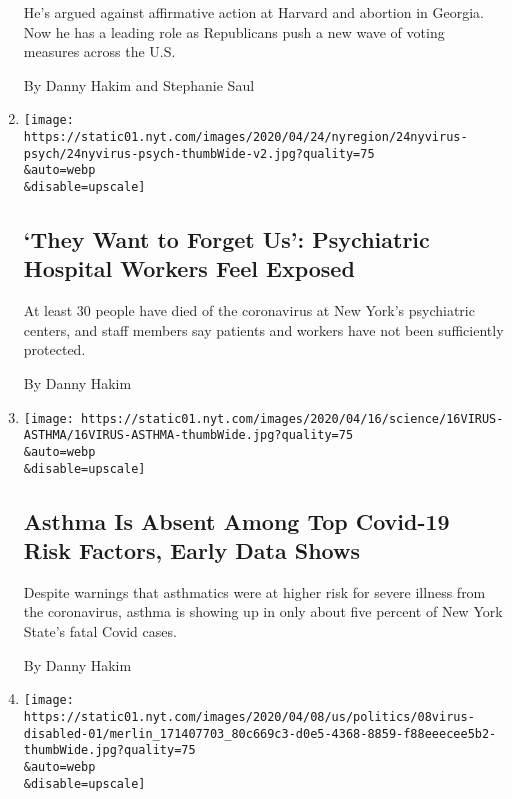 \begin{enumerate}
  He's argued against affirmative action at Harvard and abortion in
  Georgia. Now he has a leading role as Republicans push a new wave of
  voting measures across the U.S.

  By Danny Hakim and Stephanie Saul
\item
  \href{/2020/04/24/nyregion/coronavirus-new-york-psychiatric-hospitals.html}{}

  \texttt{[image: https://static01.nyt.com/images/2020/04/24/nyregion/24nyvirus-psych/24nyvirus-psych-thumbWide-v2.jpg?quality=75\\\&auto=webp\\\&disable=upscale]}

  \hypertarget{they-want-to-forget-us-psychiatric-hospital-workers-feel-exposed}{%
  \subsection{`They Want to Forget Us': Psychiatric Hospital Workers
  Feel
  Exposed}\label{they-want-to-forget-us-psychiatric-hospital-workers-feel-exposed}}

  At least 30 people have died of the coronavirus at New York's
  psychiatric centers, and staff members say patients and workers have
  not been sufficiently protected.

  By Danny Hakim
\item
  \href{/2020/04/16/health/coronavirus-asthma-risk.html}{}

  \texttt{[image: https://static01.nyt.com/images/2020/04/16/science/16VIRUS-ASTHMA/16VIRUS-ASTHMA-thumbWide.jpg?quality=75\\\&auto=webp\\\&disable=upscale]}

  \hypertarget{asthma-is-absent-among-top-covid-19-risk-factors-early-data-shows}{%
  \subsection{Asthma Is Absent Among Top Covid-19 Risk Factors, Early
  Data
  Shows}\label{asthma-is-absent-among-top-covid-19-risk-factors-early-data-shows}}

  Despite warnings that asthmatics were at higher risk for severe
  illness from the coronavirus, asthma is showing up in only about five
  percent of New York State's fatal Covid cases.

  By Danny Hakim
\item
  \href{/2020/04/08/nyregion/coronavirus-disabilities-group-homes.html}{}

  \texttt{[image: https://static01.nyt.com/images/2020/04/08/us/politics/08virus-disabled-01/merlin\_171407703\_80c669c3-d0e5-4368-8859-f88eeecee5b2-thumbWide.jpg?quality=75\\\&auto=webp\\\&disable=upscale]}


\end{enumerate}
